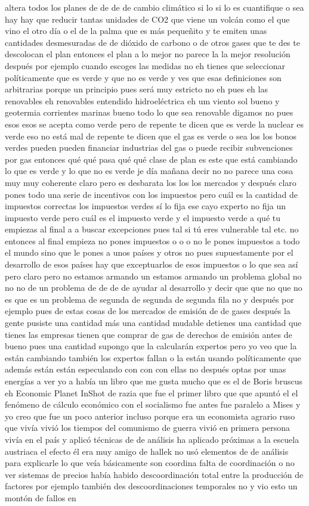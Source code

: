 altera todos los planes de de de de cambio climático si lo si lo es cuantifique o sea hay hay que reducir tantas unidades de CO2 que viene un volcán como el que vino el otro día o el de la palma que es más pequeñito y te emiten unas cantidades desmesuradas de de dióxido de carbono o de otros gases que te des te descolocan el plan entonces el plan a lo mejor no parece la la mejor resolución después por ejemplo cuando escoges las medidas no eh tienes que seleccionar políticamente que es verde y que no es verde y ves que esas definiciones son arbitrarias porque un principio pues será muy estricto no eh pues eh las renovables eh renovables entendido hidroeléctrica eh um viento sol bueno y geotermia corrientes marinas bueno todo lo que sea renovable digamos no pues esos esos se acepta como verde pero de repente te dicen que es verde la nuclear es verde eso no está mal de repente te dicen que el gas es verde o sea los los bonos verdes pueden pueden financiar industrias del gas o puede recibir subvenciones por gas entonces qué qué pasa qué qué clase de plan es este que está cambiando lo que es verde y lo que no es verde je día mañana decir no no parece una cosa muy muy coherente claro pero es desbarata los los los mercados y después claro pones todo una serie de incentivos con los impuestos pero cuál es la cantidad de impuestos correctas los impuestos verdes sí lo fija ese cayo experto no fija un impuesto verde pero cuál es el impuesto verde y el impuesto verde a qué tu empiezas al final a a buscar excepciones pues tal si tú eres vulnerable tal etc. no entonces al final empieza no pones impuestos o o o no le pones impuestos a todo el mundo sino que le pones a unos países y otros no pues supuestamente por el desarrollo de esos países hay que exceptuarlos de esos impuestos o lo que sea así pero claro pero no estamos armando un estamos armando un problema global no no no de un problema de de de de ayudar al desarrollo y decir que que no que no es que es un problema de segunda de segunda de segunda fila no y después por ejemplo pues de estas cosas de los mercados de emisión de de gases después la gente pusiste una cantidad más una cantidad mudable detienes una cantidad que tienes las empresas tienen que comprar de gas de derechos de emisión antes de bueno pues una cantidad supongo que la calcularán expertos pero yo veo que la están cambiando también los expertos fallan o la están usando políticamente que además están están especulando con con con ellas no después optas por unas energías a ver yo a había un libro que me gusta mucho que es el de Boris bruscus eh Economic Planet InShot de razia que fue el primer libro que que apuntó el el fenómeno de cálculo económico con el socialismo fue antes fue paralelo a Mises y yo creo que fue un poco anterior incluso porque era un economista agrario ruso que vivía vivió los tiempos del comunismo de guerra vivió en primera persona vivía en el país y aplicó técnicas de de análisis ha aplicado próximas a la escuela austriaca el efecto él era muy amigo de hallek no usó elementos de de análisis para explicarle lo que veía básicamente son coordina falta de coordinación o no ver sistemas de precios había habido descoordinación total entre la producción de factores por ejemplo también des descoordinaciones temporales no y vio esto un montón de fallos en 